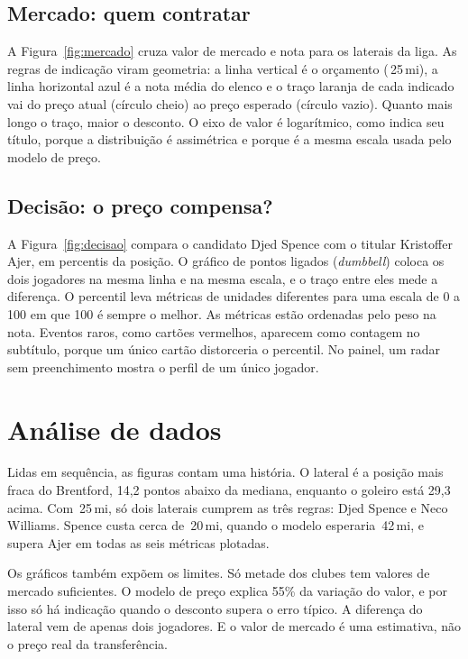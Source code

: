 \documentclass[10pt, a4paper, twocolumn]{article}
\newcommand{\eur}[1]{\texteuro\,#1\,mi}
\begin{document}
\subsection*{Mercado: quem contratar}

A Figura~\ref{fig:mercado} cruza valor de mercado e nota para os laterais da liga. As regras de indicação viram geometria: a linha vertical é o orçamento (\eur{25}), a linha horizontal azul é a nota média do elenco e o traço laranja de cada indicado vai do preço atual (círculo cheio) ao preço esperado (círculo vazio). Quanto mais longo o traço, maior o desconto. O eixo de valor é logarítmico, como indica seu título, porque a distribuição é assimétrica e porque é a mesma escala usada pelo modelo de preço.

\subsection*{Decisão: o preço compensa?}

A Figura~\ref{fig:decisao} compara o candidato Djed Spence com o titular Kristoffer Ajer, em percentis da posição. O gráfico de pontos ligados (\emph{dumbbell}) coloca os dois jogadores na mesma linha e na mesma escala, e o traço entre eles mede a diferença. O percentil leva métricas de unidades diferentes para uma escala de 0 a 100 em que 100 é sempre o melhor. As métricas estão ordenadas pelo peso na nota. Eventos raros, como cartões vermelhos, aparecem como contagem no subtítulo, porque um único cartão distorceria o percentil. No painel, um radar sem preenchimento mostra o perfil de um único jogador.

\section{Análise de dados}

Lidas em sequência, as figuras contam uma história. O lateral é a posição mais fraca do Brentford, 14,2 pontos abaixo da mediana, enquanto o goleiro está 29,3 acima. Com \eur{25}, só dois laterais cumprem as três regras: Djed Spence e Neco Williams. Spence custa cerca de \eur{20}, quando o modelo esperaria \eur{42}, e supera Ajer em todas as seis métricas plotadas.

Os gráficos também expõem os limites. Só metade dos clubes tem valores de mercado suficientes. O modelo de preço explica 55\% da variação do valor, e por isso só há indicação quando o desconto supera o erro típico. A diferença do lateral vem de apenas dois jogadores. E o valor de mercado é uma estimativa, não o preço real da transferência.
\end{document}
